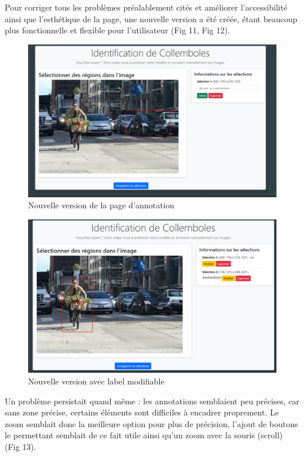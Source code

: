 \documentclass[
  10pt,
]{article}
\begin{document}
\newpage

Pour corriger tous les problèmes préalablement cités et améliorer
l'accessibilité ainsi que l'esthétique de la page, une nouvelle version
a été créée, étant beaucoup plus fonctionnelle et flexible pour
l'utilisateur (Fig 11, Fig 12).

\begin{figure}[htbp]
\centering
\includegraphics[width=\textwidth]{img_rmd/fig10.png}
\caption{Nouvelle version de la page d'annotation}
\end{figure}

\begin{figure}[htbp]
\centering
\includegraphics[width=\textwidth]{img_rmd/fig11.png}
\caption{Nouvelle version avec label modifiable }
\end{figure}

Un problème persistait quand même : les annotations semblaient peu
précises, car sans zone précise, certains éléments sont difficiles à
encadrer proprement. Le zoom semblait donc la meilleure option pour plus
de précision, l'ajout de boutons le permettant semblait de ce fait utile
ainsi qu'un zoom avec la souris (scroll) (Fig 13).
\end{document}
